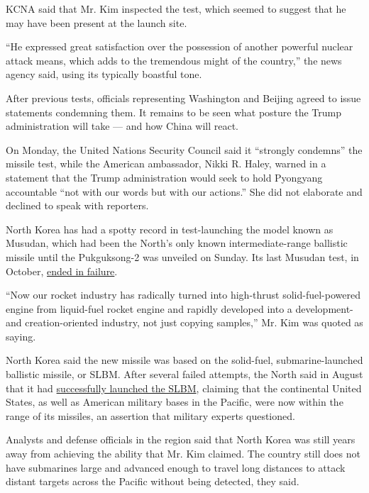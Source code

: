 KCNA said that Mr. Kim inspected the test, which seemed to suggest that
he may have been present at the launch site.

``He expressed great satisfaction over the possession of another
powerful nuclear attack means, which adds to the tremendous might of the
country,'' the news agency said, using its typically boastful tone.

After previous tests, officials representing Washington and Beijing
agreed to issue statements condemning them. It remains to be seen what
posture the Trump administration will take --- and how China will react.

On Monday, the United Nations Security Council said it ``strongly
condemns'' the missile test, while the American ambassador, Nikki R.
Haley, warned in a statement that the Trump administration would seek to
hold Pyongyang accountable ``not with our words but with our actions.''
She did not elaborate and declined to speak with reporters.

North Korea has had a spotty record in test-launching the model known as
Musudan, which had been the North's only known intermediate-range
ballistic missile until the Pukguksong-2 was unveiled on Sunday. Its
last Musudan test, in October,
\href{https://www.nytimes3xbfgragh.onion/2016/10/20/world/asia/north-korea-musudan-missile-failure.html}{ended
in failure}.

``Now our rocket industry has radically turned into high-thrust
solid-fuel-powered engine from liquid-fuel rocket engine and rapidly
developed into a development- and creation-oriented industry, not just
copying samples,'' Mr. Kim was quoted as saying.

North Korea said the new missile was based on the solid-fuel,
submarine-launched ballistic missile, or SLBM. After several failed
attempts, the North said in August that it had
\href{https://www.nytimes3xbfgragh.onion/2016/08/25/world/asia/north-korea-kim-jong-un-missile-test.html}{successfully
launched the SLBM}, claiming that the continental United States, as well
as American military bases in the Pacific, were now within the range of
its missiles, an assertion that military experts questioned.

Analysts and defense officials in the region said that North Korea was
still years away from achieving the ability that Mr. Kim claimed. The
country still does not have submarines large and advanced enough to
travel long distances to attack distant targets across the Pacific
without being detected, they said.

